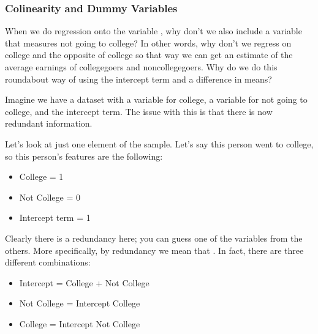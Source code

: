 \documentclass[letterpaper,10pt,english]{jupyterBook}
\begin{document}
\subsubsection{Colinearity and Dummy Variables}
\label{\detokenize{content/11-econometrics/multivariable:colinearity-and-dummy-variables}}
\sphinxAtStartPar
When we do regression onto the variable , why don’t we also include a variable that measures not going to college? In other words, why don’t we regress on college and the opposite of college so that way we can get an estimate of the average earnings of college\sphinxhyphen{}goers and non\sphinxhyphen{}college\sphinxhyphen{}goers. Why do we do this roundabout way of using the intercept term and a difference in means?

\sphinxAtStartPar
Imagine we have a dataset with a variable for college, a variable for not going to college, and the intercept term. The issue with this is that there is now redundant information.

\sphinxAtStartPar
Let’s look at just one element of the sample. Let’s say this person went to college, so this person’s features are the following:
\begin{itemize}
\item {} 
\sphinxAtStartPar
College = 1

\item {} 
\sphinxAtStartPar
Not College = 0

\item {} 
\sphinxAtStartPar
Intercept term = 1

\end{itemize}

\sphinxAtStartPar
Clearly there is a redundancy here; you can guess one of the variables from the others. More specifically, by redundancy we mean that . In fact, there are three different combinations:
\begin{itemize}
\item {} 
\sphinxAtStartPar
Intercept = College + Not College

\item {} 
\sphinxAtStartPar
Not College = Intercept \sphinxhyphen{} College

\item {} 
\sphinxAtStartPar
College = Intercept \sphinxhyphen{} Not College

\end{itemize}
\end{document}

